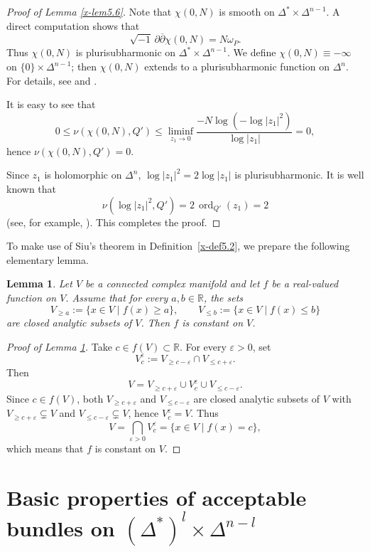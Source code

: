 \documentclass[12pt,twoside]{amsart}
\newtheorem{lem}[thm]{Lemma}
\theoremstyle{definition}
\begin{document}
\begin{proof}[Proof of Lemma \ref{x-lem5.6}]
Note that $\chi(0, N)$ is smooth on $\Delta^* \times \Delta^{n-1}$. 
A direct computation shows that
\[
\sqrt{-1}\,\partial \overline\partial \chi(0, N) = N \omega_P.
\]
Thus $\chi(0, N)$ is plurisubharmonic on $\Delta^* \times \Delta^{n-1}$. 
We define $\chi(0, N) \equiv -\infty$ on $\{0\} \times \Delta^{n-1}$; 
then $\chi(0, N)$ extends to a plurisubharmonic function on $\Delta^n$. 
For details, see \cite[(3.3.41) Theorem]{noguchi-ochiai} and 
\cite[Chapter~I, (5.24) Theorem]{demailly}. 

It is easy to see that
\[
0 \le \nu(\chi(0, N), Q') \le 
\liminf_{z_1 \to 0} 
\frac{-N \log(-\log |z_1|^2)}{\log |z_1|} = 0,
\]
hence $\nu(\chi(0, N), Q') = 0$. 

Since $z_1$ is holomorphic on $\Delta^n$, $\log |z_1|^2 = 2\log |z_1|$ is plurisubharmonic. 
It is well known that 
\[
\nu(\log |z_1|^2, Q') = 2\, \operatorname{ord}_{Q'}(z_1) = 2
\]
(see, for example, \cite[(2.8) Theorem (b)]{demailly1}). 
This completes the proof. 
\end{proof}

To make use of Siu's theorem in Definition~\ref{x-def5.2}, 
we prepare the following elementary lemma. 

\begin{lem}\label{x-lem5.7}
Let $V$ be a connected complex manifold and let $f$ be a real-valued function on $V$. 
Assume that for every $a, b \in \mathbb R$, the sets
\[
V_{\ge a} := \{ x \in V \mid f(x) \ge a \}, 
\qquad
V_{\le b} := \{ x \in V \mid f(x) \le b \}
\]
are closed analytic subsets of $V$. 
Then $f$ is constant on $V$. 
\end{lem}

\begin{proof}[Proof of Lemma \ref{x-lem5.7}]
Take $c \in f(V) \subset \mathbb R$. 
For every $\varepsilon > 0$, set
\[
V_c^\varepsilon := V_{\ge c - \varepsilon} \cap V_{\le c + \varepsilon}.
\]
Then 
\[
V = V_{\ge c + \varepsilon} \cup V_c^\varepsilon \cup V_{\le c - \varepsilon}.
\]
Since $c \in f(V)$, both $V_{\ge c + \varepsilon}$ 
and $V_{\le c - \varepsilon}$ are closed analytic subsets 
of $V$ with $V_{\ge c + \varepsilon}\subsetneq V$ 
and $V_{\le c - \varepsilon}\subsetneq V$, hence $V_c^\varepsilon = V$. 
Thus 
\[
V = \bigcap_{\varepsilon > 0} V_c^\varepsilon = \{ x \in V \mid f(x) = c \},
\]
which means that $f$ is constant on $V$. 
\end{proof}

\section{Basic properties of acceptable bundles on 
$(\Delta^*)^l \times \Delta^{n-l}$}\label{x-sec6}
\end{document}
